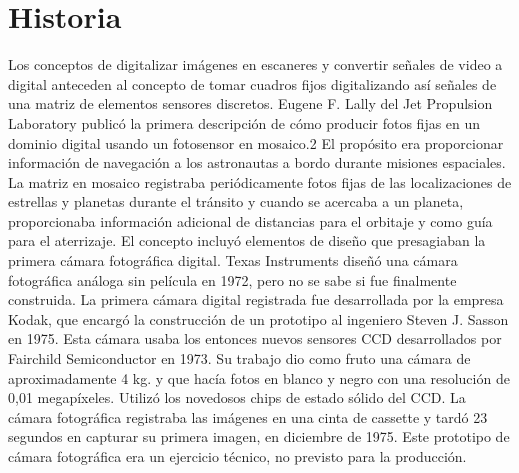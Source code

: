 \documentclass[12pt,a4paper]{report}
\begin{document}
\section{Historia}

Los conceptos de digitalizar imágenes en escaneres y convertir señales de video a digital anteceden al concepto de tomar cuadros fijos digitalizando así señales de una matriz de elementos sensores discretos. Eugene F. Lally del Jet Propulsion Laboratory publicó la primera descripción de cómo producir fotos fijas en un dominio digital usando un fotosensor en mosaico.2 El propósito era proporcionar información de navegación a los astronautas a bordo durante misiones espaciales. La matriz en mosaico registraba periódicamente fotos fijas de las localizaciones de estrellas y planetas durante el tránsito y cuando se acercaba a un planeta, proporcionaba información adicional de distancias para el orbitaje y como guía para el aterrizaje. El concepto incluyó elementos de diseño que presagiaban la primera cámara fotográfica digital.
Texas Instruments diseñó una cámara fotográfica análoga sin película en 1972, pero no se sabe si fue finalmente construida. La primera cámara digital registrada fue desarrollada por la empresa Kodak, que encargó la construcción de un prototipo al ingeniero Steven J. Sasson en 1975. Esta cámara usaba los entonces nuevos sensores CCD desarrollados por Fairchild Semiconductor en 1973. Su trabajo dio como fruto una cámara de aproximadamente 4 kg. y que hacía fotos en blanco y negro con una resolución de 0,01 megapíxeles. Utilizó los novedosos chips de estado sólido del CCD. La cámara fotográfica registraba las imágenes en una cinta de cassette y tardó 23 segundos en capturar su primera imagen, en diciembre de 1975. Este prototipo de cámara fotográfica era un ejercicio técnico, no previsto para la producción.
\end{document}
